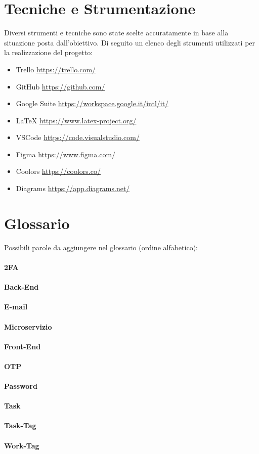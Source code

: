 \documentclass{report}
\begin{document}
\chapter{Tecniche e Strumentazione}
Diversi strumenti e tecniche sono state scelte accuratamente in base alla situazione posta dall’obiettivo. Di seguito un elenco degli strumenti utilizzati per la realizzazione del progetto:

\begin{itemize}
	\item Trello \qquad \url{https://trello.com/}
	\item GitHub \qquad \url{https://github.com/}
	\item Google Suite \qquad \url{https://workspace.google.it/intl/it/}
	\item LaTeX \qquad \url{https://www.latex-project.org/}
	\item VSCode \qquad \url{https://code.visualstudio.com/}
	\item Figma \qquad \url{https://www.figma.com/}
	\item Coolors \qquad \url{https://coolors.co/}
	\item Diagrams \qquad \url{https://app.diagrams.net/}
\end{itemize}

\chapter{Glossario}
Possibili parole da aggiungere nel glossario (ordine alfabetico):
\subsubsection*{2FA}
\subsubsection*{Back-End}
\subsubsection*{E-mail}
\subsubsection*{Microservizio}
\subsubsection*{Front-End}
\subsubsection*{OTP}
\subsubsection*{Password}
\subsubsection*{Task}
\subsubsection*{Task-Tag}
\subsubsection*{Work-Tag}
\end{document}
